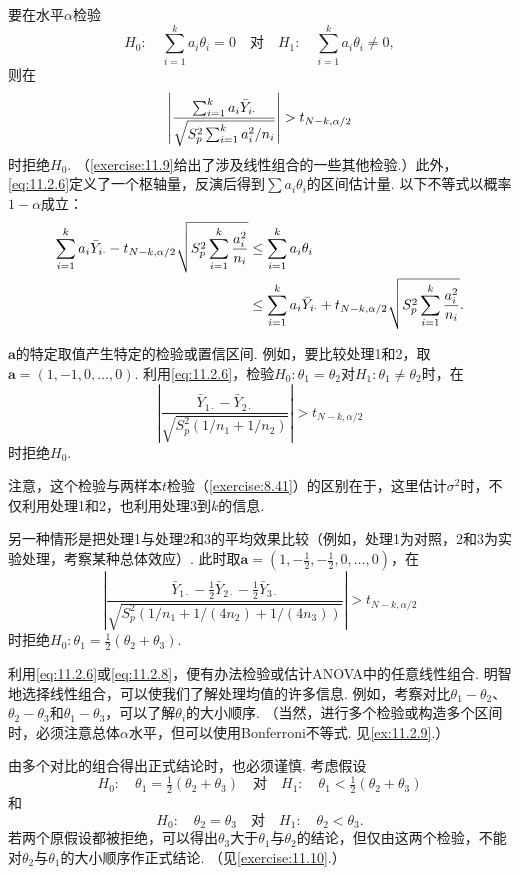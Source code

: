 要在水平$\alpha$检验
$$H_0:\quad\sum_{i=1}^ka_i\theta_i=0\quad\text{对}\quad H_1:\quad\sum_{i=1}^ka_i\theta_i\ne0,$$
则在
\begin{equation}\label{eq:11.2.7}\index{SI0051@t检验}\index{SI1017@方差分析}
\left|\frac{\sum_{i=1}^ka_i\bar Y_{i\cdot}}{\sqrt{S_p^2\sum_{i=1}^ka_i^2/n_i}}\right|>t_{N-k,\alpha/2}
\end{equation}
时拒绝$H_0$. （\autoref{exercise:11.9}给出了涉及线性组合的一些其他检验.）此外，\eqref{eq:11.2.6}定义了一个枢轴量，反演后得到$\sum a_i\theta_i$的区间估计量. 以下不等式以概率$1-\alpha$成立：
\begin{equation}\label{eq:11.2.8}\index{SI0030@置信区间}\index{SI0136@方差分析}
\begin{aligned}
\sum_{i=1}^ka_i\bar Y_{i\cdot}-t_{N-k,\alpha/2}\sqrt{S_p^2\sum_{i=1}^k\frac{a_i^2}{n_i}}
&\le\sum_{i=1}^ka_i\theta_i\\
&\le\sum_{i=1}^ka_i\bar Y_{i\cdot}+t_{N-k,\alpha/2}\sqrt{S_p^2\sum_{i=1}^k\frac{a_i^2}{n_i}}.
\end{aligned}
\end{equation}

\begin{example}[ANOVA对比]\label{ex:11.2.6}
$\boldsymbol a$的特定取值产生特定的检验或置信区间. 例如，要比较处理1和2，取$\boldsymbol a=(1,-1,0,\ldots,0)$. 利用\eqref{eq:11.2.6}，检验$H_0:\theta_1=\theta_2$对$H_1:\theta_1\ne\theta_2$时，在
$$\left|\frac{\bar Y_{1\cdot}-\bar Y_{2\cdot}}{\sqrt{S_p^2(1/n_1+1/n_2)}}\right|>t_{N-k,\alpha/2}$$
时拒绝$H_0$.

注意，这个检验与两样本$t$检验（\autoref{exercise:8.41}）的区别在于，这里估计$\sigma^2$时，不仅利用处理1和2，也利用处理3到$k$的信息.

另一种情形是把处理1与处理2和3的平均效果比较（例如，处理1为对照，2和3为实验处理，考察某种总体效应）. 此时取$\boldsymbol a=(1,-\tfrac12,-\tfrac12,0,\ldots,0)$，在
$$\left|\frac{\bar Y_{1\cdot}-\tfrac12\bar Y_{2\cdot}-\tfrac12\bar Y_{3\cdot}}
{\sqrt{S_p^2(1/n_1+1/(4n_2)+1/(4n_3))}}\right|>t_{N-k,\alpha/2}$$
时拒绝$H_0:\theta_1=\tfrac12(\theta_2+\theta_3)$.

利用\eqref{eq:11.2.6}或\eqref{eq:11.2.8}，便有办法检验或估计ANOVA中的任意线性组合. 明智地选择线性组合，可以使我们了解处理均值的许多信息. 例如，考察对比$\theta_1-\theta_2$、$\theta_2-\theta_3$和$\theta_1-\theta_3$，可以了解$\theta_i$的大小顺序. （当然，进行多个检验或构造多个区间时，必须注意总体$\alpha$水平，但可以使用Bonferroni不等式. 见\autoref{ex:11.2.9}.）

由多个对比的组合得出正式结论时，也必须谨慎. 考虑假设
$$H_0:\quad\theta_1=\tfrac12(\theta_2+\theta_3)\quad\text{对}\quad H_1:\quad\theta_1<\tfrac12(\theta_2+\theta_3)$$
和
$$H_0:\quad\theta_2=\theta_3\quad\text{对}\quad H_1:\quad\theta_2<\theta_3.$$
若两个原假设都被拒绝，可以得出$\theta_3$大于$\theta_1$与$\theta_2$的结论，但仅由这两个检验，不能对$\theta_2$与$\theta_1$的大小顺序作正式结论. （见\autoref{exercise:11.10}.）
\end{example}

